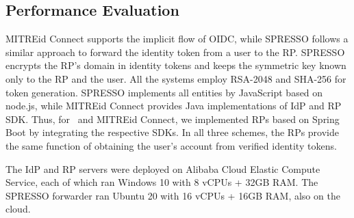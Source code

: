 \subsection{Performance Evaluation}
\label{sec:evaluation}


MITREid Connect supports the implicit flow of OIDC, while SPRESSO follows a similar approach to forward the identity token from a user to the RP.
SPRESSO encrypts the RP's domain in identity tokens and keeps the symmetric key known only to the RP and the user. All the systems employ RSA-2048 and SHA-256 for token generation.
SPRESSO implements all entities by JavaScript based on node.js, while MITREid Connect provides Java implementations of IdP and RP SDK.
Thus, for \usso\ and MITREid Connect, we implemented RPs based on Spring Boot by integrating the respective SDKs. In all three schemes, the RPs provide the same function of obtaining the user's account from verified identity tokens.

The IdP and RP servers were deployed on Alibaba Cloud Elastic Compute Service,
each of which ran Windows 10 with 8 vCPUs + 32GB RAM. The SPRESSO forwarder ran Ubuntu 20 with 16 vCPUs + 16GB RAM, also on the cloud. 

